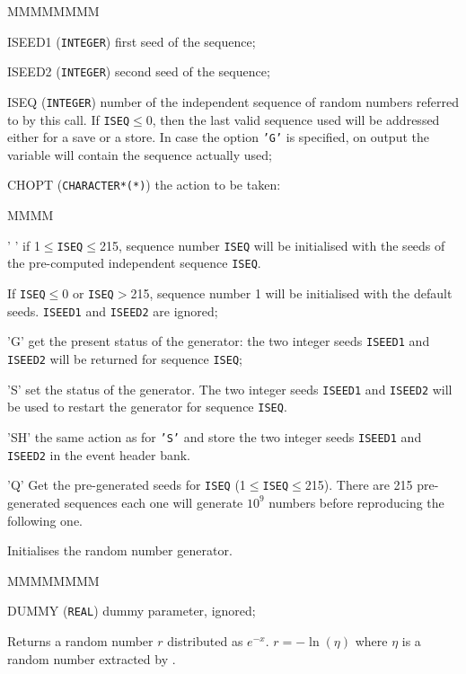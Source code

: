 \begin{DLtt}{MMMMMMMM}
\item[ISEED1] ({\tt INTEGER}) first seed of the sequence;
\item[ISEED2] ({\tt INTEGER}) second seed of the sequence;
\item[ISEQ] ({\tt INTEGER}) number of the independent
sequence of random numbers referred to by this call. If
{\tt ISEQ}$\leq$0, then the last valid sequence used will be addressed
either for a save or a store. In case the option {\tt 'G'} is
specified, on output the variable will contain the sequence
actually used;
\item[CHOPT] ({\tt CHARACTER*(*)}) the action to be taken:
\begin{DLtt}{MMMM}
\item[' ']  if 1$\leq${\tt ISEQ}$\leq$215, sequence number {\tt ISEQ} will be
initialised with the seeds of the pre-computed
independent sequence {\tt ISEQ}.

If {\tt ISEQ}$\leq$0 or {\tt ISEQ}$>$215, sequence number 1 will be
initialised with the default seeds. {\tt ISEED1} and {\tt ISEED2} are
ignored;
\item['G']  get the present status of the generator: the two integer
seeds {\tt ISEED1} and {\tt ISEED2} will be returned for sequence
{\tt ISEQ};
\item['S']  set the status of the generator.
The two integer seeds {\tt ISEED1} and {\tt ISEED2} will be
used to restart the generator for sequence {\tt ISEQ}.
\item['SH']  the same action as for {\tt 'S'} and store the two
integer seeds {\tt ISEED1} and {\tt ISEED2} in the event header bank.
\item['Q']  Get the pre-generated seeds for {\tt ISEQ} 
(1$\leq${\tt ISEQ}$\leq$215).
There are 215 pre-generated sequences each one will
generate $10^{9}$  numbers before reproducing the following
one.
\end{DLtt}
\end{DLtt}
 
Initialises the random number generator.
 

\begin{DLtt}{MMMMMMMM}
\item[DUMMY] ({\tt REAL}) dummy parameter, ignored;
\end{DLtt}

Returns a random number $r$ distributed as $e^{-x}$. $r = -\ln(\eta)$
where $\eta$ is a random number extracted by .

